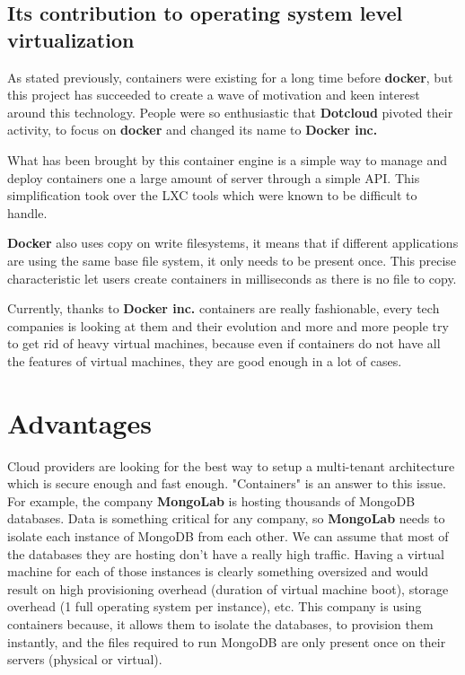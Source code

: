 \subsection{Its contribution to operating system level virtualization}

As stated previously, containers were existing for a long time before
\textbf{docker}, but this project has succeeded to create a wave of motivation
and keen interest around this technology. People were so enthusiastic that
\textbf{Dotcloud} pivoted their activity, to focus on \textbf{docker} and
changed its name to \textbf{Docker inc.}

What has been brought by this container engine is a simple way to manage and
deploy containers one a large amount of server through a simple API. This
simplification took over the LXC tools which were known to be difficult to
handle.

\textbf{Docker} also uses copy on write filesystems, it means that if different
applications are using the same base file system, it only needs to be present once.
This precise characteristic let users create containers in milliseconds as there
is no file to copy.

Currently, thanks to \textbf{Docker inc.} containers are really fashionable,
every tech companies is looking at them and their evolution and more and more
people try to get rid of heavy virtual machines, because even if containers do
not have all the features of virtual machines, they are good enough in a lot of
cases.

\section{Advantages}

Cloud providers are looking for the best way to setup a multi-tenant
architecture which is secure enough and fast enough. "Containers" is an answer
to this issue. For example, the company \textbf{MongoLab} is hosting thousands
of MongoDB databases. Data is something critical for any company, so
\textbf{MongoLab} needs to isolate each instance of MongoDB from each other.
We can assume that most of the databases they are hosting don't have a really
high traffic. Having a virtual machine for each of those instances is clearly
something oversized and would result on high provisioning overhead (duration of
virtual machine boot), storage overhead (1 full operating system per instance),
etc.  This company is using containers because, it allows them to isolate the
databases, to provision them instantly, and the files required to run MongoDB
are only present once on their servers (physical or virtual).

